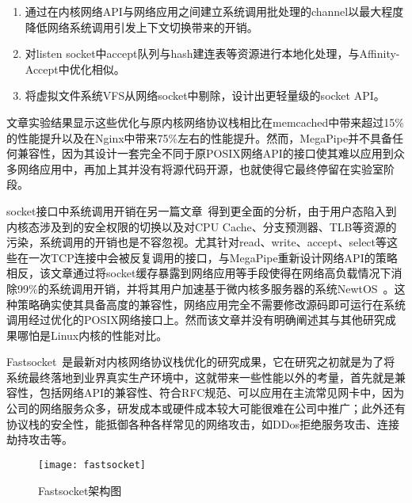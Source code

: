 \begin{enumerate}[(1),labelsep=.5em, leftmargin = 0pt, itemindent = 3em]
\item 通过在内核网络API与网络应用之间建立系统调用批处理的channel以最大程度降低网络系统调用引发上下文切换带来的开销。
\item 对listen socket中accept队列与hash建连表等资源进行本地化处理，与Affinity-Accept中优化相似。
\item 将虚拟文件系统VFS从网络socket中剔除，设计出更轻量级的socket API。
\end{enumerate}

文章实验结果显示这些优化与原内核网络协议栈相比在memcached中带来超过15\%的性能提升以及在Nginx中带来75\%左右的性能提升。然而，MegaPipe并不具备任何兼容性，因为其设计一套完全不同于原POSIX网络API的接口使其难以应用到众多网络应用中，再加上其并没有将源代码开源，也就使得它最终停留在实验室阶段。

socket接口中系统调用开销在另一篇文章~\cite{hruby2014sockets}得到更全面的分析，由于用户态陷入到内核态涉及到的安全权限的切换以及对CPU Cache、分支预测器、TLB等资源的污染，系统调用的开销也是不容忽视。尤其针对read、write、accept、select等这些在一次TCP连接中会被反复调用的接口，与MegaPipe重新设计网络API的策略相反，该文章通过将socket缓存暴露到网络应用等手段使得在网络高负载情况下消除99\%的系统调用开销，并将其用户加速基于微内核多服务器的系统NewtOS~\cite{hruby2012keep}。这种策略确实使其具备高度的兼容性，网络应用完全不需要修改源码即可运行在系统调用经过优化的POSIX网络接口上。然而该文章并没有明确阐述其与其他研究成果哪怕是Linux内核的性能对比。

Fastsocket~\cite{fastsocket,fastsocket-release}是最新对内核网络协议栈优化的研究成果，它在研究之初就是为了将系统最终落地到业界真实生产环境中，这就带来一些性能以外的考量，首先就是兼容性，包括网络API的兼容性、符合RFC规范、可以应用在主流常见网卡中，因为公司的网络服务众多，研发成本或硬件成本较大可能很难在公司中推广；此外还有协议栈的安全性，能抵御各种各样常见的网络攻击，如DDos拒绝服务攻击、连接劫持攻击等。

\vspace{-10pt}
\begin{figure}[H] %
  \centering
  \texttt{[image: fastsocket]}
  \caption{Fastsocket架构图}
  \label{fig:fastsocket}
\end{figure}
\vspace{-10pt}

